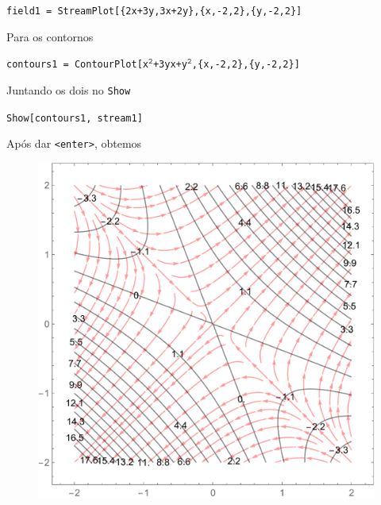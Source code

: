 \documentclass[a4paper, 12pt, brazilian]{article}
\begin{document}
	\begin{center} 			 \texttt{field1 = StreamPlot[\{2x+3y,3x+2y\},\{x,-2,2\},\{y,-2,2\}]}
	\end{center}
	Para os contornos
	\begin{center}
		\texttt{contours1 = ContourPlot[x$^{\texttt{2}}$+3yx+y$^{\texttt{2}}$,\{x,-2,2\},\{y,-2,2\}]}
	\end{center}
	Juntando os dois no \texttt{Show}
	\begin{center}
		\texttt{Show[contours1, stream1]}
	\end{center}
	Após dar \texttt{<enter>}, obtemos
	\begin{figure}[H]
		\centering
		\includegraphics[width=0.7\linewidth]{images/g1}
		\label{fig:g1}
	\end{figure}
\end{document}
